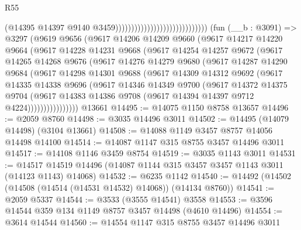 \begin{lexlean}{R55}
\begin{coremodule}
                                                            (@14395
                                                              @14397
                                                              @9140
                                                              @3459)))))))))))))))))))))))))))))
    (fun (__b : @3091) =>
    @3297
      (@9619
        @9656
        (@9617
          @14206
          @14209
          @9660
          (@9617
            @14217
            @14220
            @9664
            (@9617
              @14228
              @14231
              @9668
              (@9617
                @14254
                @14257
                @9672
                (@9617
                  @14265
                  @14268
                  @9676
                  (@9617
                    @14276
                    @14279
                    @9680
                    (@9617
                      @14287
                      @14290
                      @9684
                      (@9617
                        @14298
                        @14301
                        @9688
                        (@9617
                          @14309
                          @14312
                          @9692
                          (@9617
                            @14335
                            @14338
                            @9696
                            (@9617
                              @14346
                              @14349
                              @9700
                              (@9617
                                @14372
                                @14375
                                @9704
                                (@9617
                                  @14383
                                  @14386
                                  @9708
                                  (@9617 @14394 @14397 @9712 @4224))))))))))))))))
    @13661
@14495 := @14075 @1150 @8758 @13657
@14496 := @2059 @8760
@14498 := @3035 @14496 @3011
@14502 := @14495 (@14079 @14498) (@3104 @13661)
@14508 := @14088 @1149 @3457 @8757 @14056 @14498 @14100
@14514 := @14087 @1147 @315 @8755 @3457 @14496 @3011
@14517 := @14108 @1146 @3459 @8754
@14519 := @3035 @1143 @3011
@14531 := @14517 @14519 @14496 (@14087 @1144 @315 @3457 @3457 @1143 @3011 (@14123 @1143) @14068)
@14532 := @6235 @1142
@14540 := @14492 (@14502 (@14508 (@14514 (@14531 @14532) @14068)) (@14134 @8760))
@14541 := @2059 @5337
@14544 := @3533 (@3555 @14541) @3558
@14553 := @3596 @14544 @359 @134 @1149 @8757 @3457 @14498 (@4610 @14496)
@14554 := @3614 @14544
@14560 := @14554 @1147 @315 @8755 @3457 @14496 @3011

\end{coremodule}
\end{lexlean}
